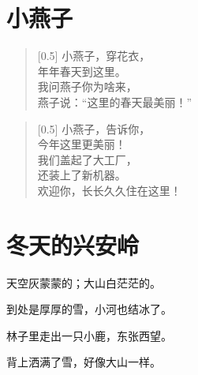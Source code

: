 \documentclass[12pt,UTF-8,openany]{ctexbook}
\begin{document}
\chapter{小燕子}

\begin{large}
    
    \begin{verse}[0.5\linewidth]
        小燕子，穿花衣， \\
        年年春天到这里。 \\
        我问燕子你为啥来， \\
        燕子说：“这里的春天最美丽！”
    \end{verse}
    
    
    \begin{verse}[0.5\linewidth]
        小燕子，告诉你， \\
        今年这里更美丽！ \\
        我们盖起了大工厂， \\
        还装上了新机器。 \\
        欢迎你，长长久久住在这里！
    \end{verse}
    
\end{large}





\chapter{冬天的兴安岭}

\begin{large}
    
    天空灰蒙蒙的；大山白茫茫的。
    
    到处是厚厚的雪，小河也结冰了。
    
    林子里走出一只小鹿，东张西望。
    
    背上洒满了雪，好像大山一样。
    
\end{large}
\end{document}
